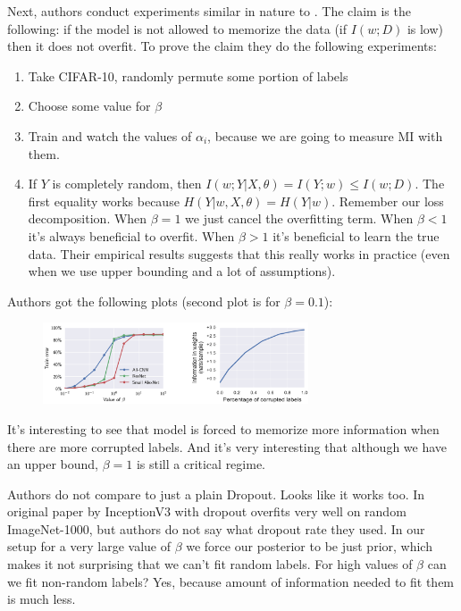 \documentclass{article}
\begin{document}
Next, authors conduct experiments similar in nature to \cite{We_dont_know_what_generalization_is}.
The claim is the following: if the model is not allowed to memorize the data (if $I(w;D)$ is low) then it does not overfit.
To prove the claim they do the following experiments:
\begin{enumerate}
    \item Take CIFAR-10, randomly permute some portion of labels
    \item Choose some value for $\beta$
    \item Train and watch the values of $\alpha_i$, because we are going to measure MI with them.
    \item If $Y$ is completely random, then $I(w;Y|X,\theta) = I(Y;w) \leq I(w;D)$. The first equality works because $H(Y|w,X,\theta) = H(Y|w)$. Remember our loss decomposition. When $\beta = 1$ we just cancel the overfitting term. When $\beta < 1$ it's always beneficial to overfit. When $\beta > 1$ it's beneficial to learn the true data. Their empirical results suggests that this really works in practice (even when we use upper bounding and a lot of assumptions).
\end{enumerate}

Authors got the following plots (second plot is for $\beta = 0.1$):

\begin{figure}[H]
\centering
\includegraphics[width=0.7\textwidth]{emergence_of_invariance_MI_experiments}
\end{figure}

It's interesting to see that model is forced to memorize more information when there are more corrupted labels.
And it's very interesting that although we have an upper bound, $\beta = 1$ is still a critical regime.

\begin{remark}
Authors do not compare to just a plain Dropout.
Looks like it works too.
In original paper by \cite{We_dont_know_what_generalization_is} InceptionV3 with dropout overfits very well on random ImageNet-1000, but authors do not say what dropout rate they used.
In our setup for a very large value of $\beta$ we force our posterior to be just prior, which makes it not surprising that we can't fit random labels.
For high values of $\beta$ can we fit non-random labels? Yes, because amount of information needed to fit them is much less.
\end{remark}
\end{document}
